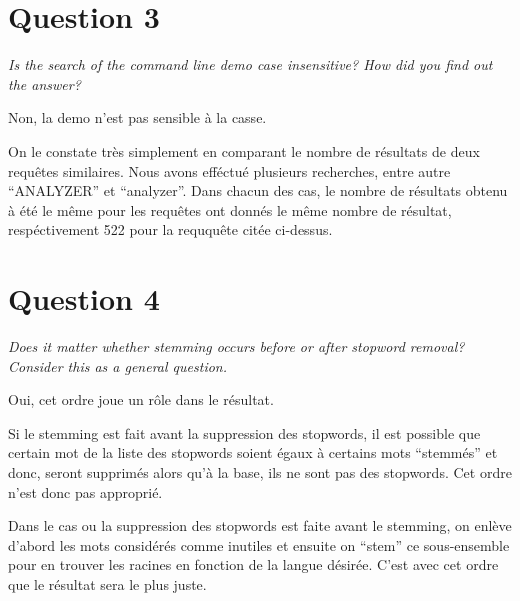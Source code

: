 \section{Question 3}
\textit{Is the search of the command line demo case insensitive? How did you find out the answer?}

Non, la demo n'est pas sensible à la casse. 

On le constate très simplement en comparant le nombre de résultats de deux requêtes similaires. Nous avons efféctué plusieurs recherches, entre autre ``ANALYZER'' et ``analyzer''. Dans chacun des cas, le nombre de résultats obtenu à été le même pour les requêtes ont donnés le même nombre de résultat, respéctivement 522 pour la reququête citée ci-dessus. 

\section{Question 4}
\textit{Does it matter whether stemming occurs before or after stopword removal? Consider this as a general question.}

Oui, cet ordre joue un rôle dans le résultat.

Si le stemming est fait avant la suppression des stopwords, il est possible que certain mot de la liste des stopwords soient égaux à certains mots ``stemmés'' et donc, seront supprimés alors qu'à la base, ils ne sont pas des stopwords. Cet ordre n'est donc pas approprié. 

Dans le cas ou la suppression des stopwords est faite avant le stemming, on enlève d'abord les mots considérés comme inutiles et ensuite on ``stem'' ce sous-ensemble pour en trouver les racines en fonction de la langue désirée. C'est avec cet ordre que le résultat sera le plus juste.